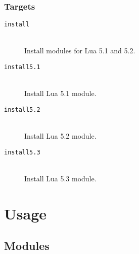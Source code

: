 \documentclass[11pt, oneside]{memoir}
\begin{document}
\subsection{Targets}

\begin{description}

\item[\texttt{install}] \hfill \\
Install modules for Lua 5.1 and 5.2.

\item[\texttt{install5.1}] \hfill \\
Install Lua 5.1 module.

\item[\texttt{install5.2}] \hfill \\
Install Lua 5.2 module.

\item[\texttt{install5.3}] \hfill \\
Install Lua 5.3 module.

\end{description}


\chapter{Usage}

\section{Modules}
\end{document}
